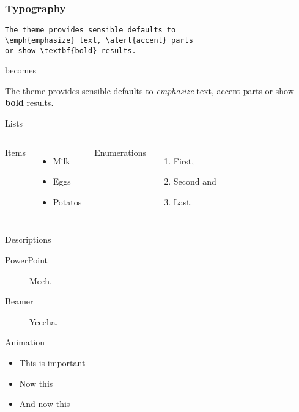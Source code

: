 \documentclass[10pt]{beamer}
\begin{document}
\begin{frame}[fragile]
  \frametitle{Typography}
      \begin{verbatim}The theme provides sensible defaults to
\emph{emphasize} text, \alert{accent} parts
or show \textbf{bold} results.\end{verbatim}

  \begin{center}becomes\end{center}

  The theme provides sensible defaults to \emph{emphasize} text,
  \alert{accent} parts or show \textbf{bold} results.
\end{frame}
\begin{frame}{Lists}
  \begin{columns}[onlytextwidth]
      Items
      \begin{itemize}
        \item Milk \item Eggs \item Potatos
      \end{itemize}

      Enumerations
      \begin{enumerate}
        \item First, \item Second and \item Last.
      \end{enumerate}
  \end{columns}
\end{frame}
\begin{frame}{Descriptions}
  \begin{description}
    \item[PowerPoint] Meeh.
    \item[Beamer] Yeeeha.
  \end{description}
\end{frame}
\begin{frame}{Animation}
  \begin{itemize}[<+- | alert@+>]
    \item \alert<4>{This is important}
    \item Now this
    \item And now this
  \end{itemize}
\end{frame}
\end{document}
